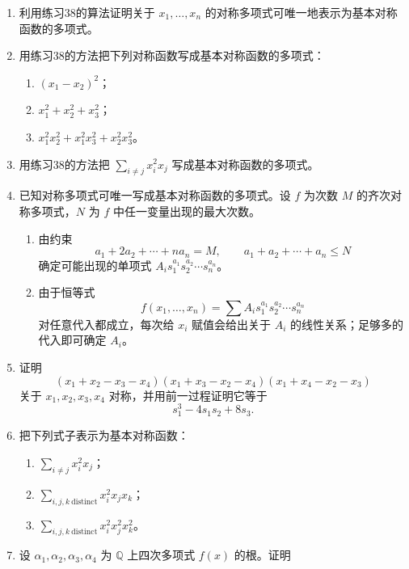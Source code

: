 \begin{enumerate}[label=\arabic*.]
\begin{enumerate}[label=(\alph*)]
		\[
		As_1^{a_1-a_2}s_2^{a_2-a_3}\cdots s_n^{a_n}
		\]
		有相同的字典序首项。
		\item 证明从 $f$ 中减去这个单项式后，得到 $0$ 或者一个同次数、所有项字典序更小的对称多项式。
		\item 证明反复执行此过程会终止，并把 $f$ 表成基本对称函数的多项式。
	\end{enumerate}
	\item 利用练习38的算法证明关于 $x_1,
	\ldots,x_n$ 的对称多项式可唯一地表示为基本对称函数的多项式。
	\item 用练习38的方法把下列对称函数写成基本对称函数的多项式：
	\begin{enumerate}[label=(\alph*)]
		\item $(x_1-x_2)^2$；
		\item $x_1^2+x_2^2+x_3^2$；
		\item $x_1^2x_2^2+x_1^2x_3^2+x_2^2x_3^2$。
	\end{enumerate}
	\item 用练习38的方法把 $\sum_{i\ne j}x_i^2x_j$ 写成基本对称函数的多项式。
	\item 已知对称多项式可唯一写成基本对称函数的多项式。设 $f$ 为次数 $M$ 的齐次对称多项式，$N$ 为 $f$ 中任一变量出现的最大次数。
	\begin{enumerate}[label=(\alph*)]
		\item 由约束
		\[
		a_1+2a_2+\cdots+na_n=M,
		\qquad
		a_1+a_2+\cdots+a_n\le N
		\]
		确定可能出现的单项式 $A_is_1^{a_1}s_2^{a_2}\cdots s_n^{a_n}$。
		\item 由于恒等式
		\[
		f(x_1,
		\ldots,x_n)=\sum A_is_1^{a_1}s_2^{a_2}\cdots s_n^{a_n}
		\]
		对任意代入都成立，每次给 $x_i$ 赋值会给出关于 $A_i$ 的线性关系；足够多的代入即可确定 $A_i$。
	\end{enumerate}
	\item 证明
	\[
	(x_1+x_2-x_3-x_4)(x_1+x_3-x_2-x_4)(x_1+x_4-x_2-x_3)
	\]
	关于 $x_1,x_2,x_3,x_4$ 对称，并用前一过程证明它等于
	\[
	s_1^3-4s_1s_2+8s_3.
	\]
	\item 把下列式子表示为基本对称函数：
	\begin{enumerate}[label=(\alph*)]
		\item $\sum_{i\ne j}x_i^2x_j$；
		\item $\sum_{i,j,k\ \mathrm{distinct}}x_i^2x_jx_k$；
		\item $\sum_{i,j,k\ \mathrm{distinct}}x_i^2x_j^2x_k^2$。
	\end{enumerate}
	\item 设 $\alpha_1,
	\alpha_2,
	\alpha_3,
	\alpha_4$ 为 $\mathbb Q$ 上四次多项式 $f(x)$ 的根。证明

\end{enumerate}
